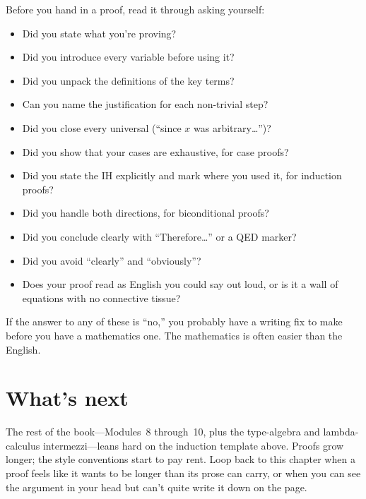 \documentclass[11pt]{article}
\begin{document}
Before you hand in a proof, read it through asking yourself:

\begin{itemize}
  \item Did you state what you're proving?
  \item Did you introduce every variable before using it?
  \item Did you unpack the definitions of the key terms?
  \item Can you name the justification for each non-trivial step?
  \item Did you close every universal (``since $x$ was arbitrary\ldots'')?
  \item Did you show that your cases are exhaustive, for case proofs?
  \item Did you state the IH explicitly and mark where you used it, for induction proofs?
  \item Did you handle both directions, for biconditional proofs?
  \item Did you conclude clearly with ``Therefore\ldots'' or a QED marker?
  \item Did you avoid ``clearly'' and ``obviously''?
  \item Does your proof read as English you could say out loud, or is it a wall of equations with no connective tissue?
\end{itemize}

If the answer to any of these is ``no,'' you probably have a writing fix to make before you have a mathematics one. The mathematics is often easier than the English.

\section{What's next}

The rest of the book---Modules~8 through~10, plus the type-algebra and lambda-calculus intermezzi---leans hard on the induction template above. Proofs grow longer; the style conventions start to pay rent. Loop back to this chapter when a proof feels like it wants to be longer than its prose can carry, or when you can see the argument in your head but can't quite write it down on the page.
\end{document}
